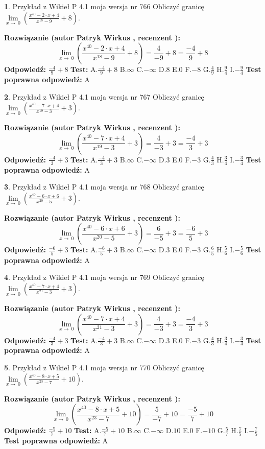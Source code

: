 \documentclass[12pt, a4paper]{article}
\theoremstyle{definition} %
\newtheorem{zad}{}
\newcommand{\zadStart}[1]{\begin{zad}#1\newline}
\newcommand{\zadStop}{\end{zad}}
\newcommand{\rozwStart}[2]{\noindent \textbf{Rozwiązanie (autor #1 , recenzent #2): }\newline}
\newcommand{\rozwStop}{\newline}
\newcommand{\odpStart}{\noindent \textbf{Odpowiedź:}\newline}
\newcommand{\odpStop}{\newline}
\newcommand{\testStart}{\noindent \textbf{Test:}\newline}
\newcommand{\testStop}{\newline}
\newcommand{\kluczStart}{\noindent \textbf{Test poprawna odpowiedź:}\newline}
\newcommand{\kluczStop}{\newline}
\begin{document}
\zadStart{Przykład z Wikieł P 4.1 moja wersja nr 766}
Obliczyć granicę $\lim\limits_{x\to\ 0}(\frac{x^{40}-2 \cdot x +4}{x^{18}-9}+8)$.
\zadStop
\rozwStart{Patryk Wirkus}{}
$$\lim\limits_{x\to\ 0}(\frac{x^{40}-2 \cdot x +4}{x^{18}-9}+8)=\frac{4}{-9}+8=\frac{-4}{9}+8$$
\rozwStop
\odpStart
$\frac{-4}{9}+8$
\odpStop
\testStart
A.$\frac{-4}{9}+8$
B.$\infty$
C.$-\infty$
D.$8$
E.$0$
F.$-8$
G.$\frac{4}{9}$
H.$\frac{9}{4}$
I.$-\frac{9}{4}$
\testStop
\kluczStart
A
\kluczStop



\zadStart{Przykład z Wikieł P 4.1 moja wersja nr 767}
Obliczyć granicę $\lim\limits_{x\to\ 0}(\frac{x^{40}-7 \cdot x +4}{x^{19}-3}+3)$.
\zadStop
\rozwStart{Patryk Wirkus}{}
$$\lim\limits_{x\to\ 0}(\frac{x^{40}-7 \cdot x +4}{x^{19}-3}+3)=\frac{4}{-3}+3=\frac{-4}{3}+3$$
\rozwStop
\odpStart
$\frac{-4}{3}+3$
\odpStop
\testStart
A.$\frac{-4}{3}+3$
B.$\infty$
C.$-\infty$
D.$3$
E.$0$
F.$-3$
G.$\frac{4}{3}$
H.$\frac{3}{4}$
I.$-\frac{3}{4}$
\testStop
\kluczStart
A
\kluczStop



\zadStart{Przykład z Wikieł P 4.1 moja wersja nr 768}
Obliczyć granicę $\lim\limits_{x\to\ 0}(\frac{x^{40}-6 \cdot x +6}{x^{20}-5}+3)$.
\zadStop
\rozwStart{Patryk Wirkus}{}
$$\lim\limits_{x\to\ 0}(\frac{x^{40}-6 \cdot x +6}{x^{20}-5}+3)=\frac{6}{-5}+3=\frac{-6}{5}+3$$
\rozwStop
\odpStart
$\frac{-6}{5}+3$
\odpStop
\testStart
A.$\frac{-6}{5}+3$
B.$\infty$
C.$-\infty$
D.$3$
E.$0$
F.$-3$
G.$\frac{6}{5}$
H.$\frac{5}{6}$
I.$-\frac{5}{6}$
\testStop
\kluczStart
A
\kluczStop



\zadStart{Przykład z Wikieł P 4.1 moja wersja nr 769}
Obliczyć granicę $\lim\limits_{x\to\ 0}(\frac{x^{40}-7 \cdot x +4}{x^{21}-3}+3)$.
\zadStop
\rozwStart{Patryk Wirkus}{}
$$\lim\limits_{x\to\ 0}(\frac{x^{40}-7 \cdot x +4}{x^{21}-3}+3)=\frac{4}{-3}+3=\frac{-4}{3}+3$$
\rozwStop
\odpStart
$\frac{-4}{3}+3$
\odpStop
\testStart
A.$\frac{-4}{3}+3$
B.$\infty$
C.$-\infty$
D.$3$
E.$0$
F.$-3$
G.$\frac{4}{3}$
H.$\frac{3}{4}$
I.$-\frac{3}{4}$
\testStop
\kluczStart
A
\kluczStop



\zadStart{Przykład z Wikieł P 4.1 moja wersja nr 770}
Obliczyć granicę $\lim\limits_{x\to\ 0}(\frac{x^{40}-8 \cdot x +5}{x^{23}-7}+10)$.
\zadStop
\rozwStart{Patryk Wirkus}{}
$$\lim\limits_{x\to\ 0}(\frac{x^{40}-8 \cdot x +5}{x^{23}-7}+10)=\frac{5}{-7}+10=\frac{-5}{7}+10$$
\rozwStop
\odpStart
$\frac{-5}{7}+10$
\odpStop
\testStart
A.$\frac{-5}{7}+10$
B.$\infty$
C.$-\infty$
D.$10$
E.$0$
F.$-10$
G.$\frac{5}{7}$
H.$\frac{7}{5}$
I.$-\frac{7}{5}$
\testStop
\kluczStart
A
\kluczStop
\end{document}
